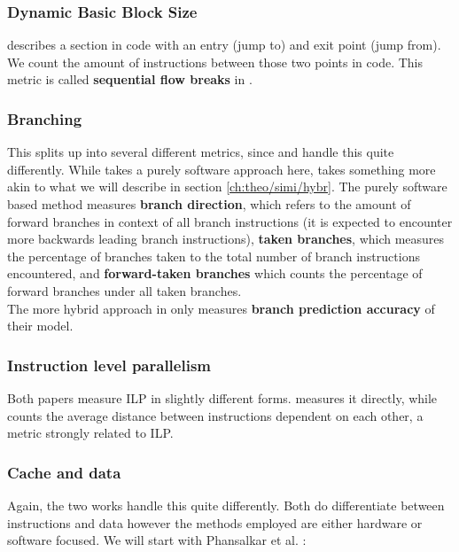 \documentclass[../bachelor_paper.tex]{subfiles}
\begin{document}
\subsubsection{Dynamic Basic Block Size}
	\label{ch:theo/simi/soft/block}
describes a section in code with an entry (jump to) and exit point (jump from). We count the amount of instructions between those two points in code. This metric is called \textbf{sequential flow breaks} in \cite{eeckhoutDesigningComputerArchitecture2003}.

\subsubsection{Branching}
	\label{ch:theo/simi/soft/bra}
This splits up into several different metrics, since \cite{phansalkarMeasuringProgramSimilarity2005} and \cite{eeckhoutDesigningComputerArchitecture2003} handle this quite differently. While \cite{phansalkarMeasuringProgramSimilarity2005} takes a purely software approach here, \cite{eeckhoutDesigningComputerArchitecture2003} takes something more akin to what we will describe in section \ref{ch:theo/simi/hybr}. The purely software based method measures \textbf{branch direction}, which refers to the amount of forward branches in context of all branch instructions (it is expected to encounter more backwards leading branch instructions), \textbf{taken branches}, which measures the percentage of branches taken to the total number of branch instructions encountered, and \textbf{forward-taken branches} which counts the percentage of forward branches under all taken branches.\\
The more hybrid approach in \cite{eeckhoutDesigningComputerArchitecture2003} only measures \textbf{branch prediction accuracy} of their model.

\subsubsection{Instruction level parallelism}
Both papers measure \ac{ILP} in slightly different forms. \cite{eeckhoutDesigningComputerArchitecture2003} measures it directly, while \cite{phansalkarMeasuringProgramSimilarity2005} counts the average distance between instructions dependent on each other, a metric strongly related to \ac{ILP}.

\subsubsection{Cache and data}
Again, the two works handle this quite differently. Both do differentiate between instructions and data however the methods employed are either hardware or software focused. We will start with Phansalkar et al. \cite{phansalkarMeasuringProgramSimilarity2005}:
\end{document}
